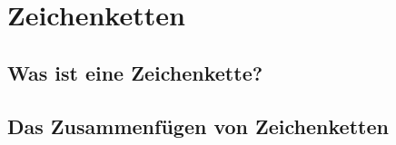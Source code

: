 \section{Zeichenketten}

\subsection*{Was ist eine Zeichenkette?}

\subsection*{Das Zusammenfügen von Zeichenketten}
